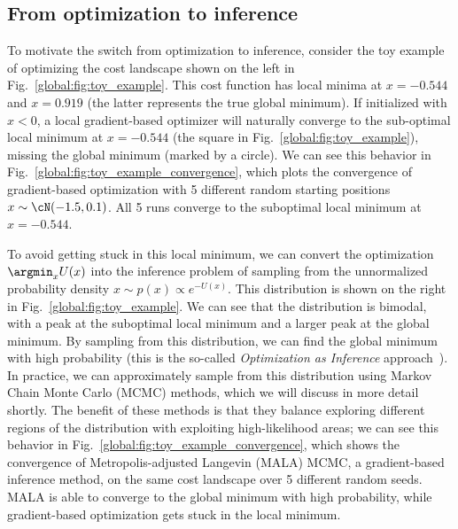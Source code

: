 


\subsection{From optimization to inference}

To motivate the switch from optimization to inference, consider the toy example of optimizing the cost landscape shown on the left in Fig.~\ref{global:fig:toy_example}. This cost function has local minima at $x = -0.544$ and $x = 0.919$ (the latter represents the true global minimum). If initialized with $x < 0$, a local gradient-based optimizer will naturally converge to the sub-optimal local minimum at $x = -0.544$ (the square in Fig.~\ref{global:fig:toy_example}), missing the global minimum (marked by a circle). We can see this behavior in Fig.~\ref{global:fig:toy_example_convergence}, which plots the convergence of gradient-based optimization with 5 different random starting positions $x\sim\cN(-1.5, 0.1)$. All 5 runs converge to the suboptimal local minimum at $x = -0.544$.

To avoid getting stuck in this local minimum, we can convert the optimization $\argmin_x U(x)$ into the inference problem of sampling from the unnormalized probability density $x \sim p(x) \propto e^{-U(x)}$. This distribution is shown on the right in Fig.~\ref{global:fig:toy_example}. We can see that the distribution is bimodal, with a peak at the suboptimal local minimum and a larger peak at the global minimum. By sampling from this distribution, we can find the global minimum with high probability (this is the so-called \textit{Optimization as Inference} approach~\cite{maSamplingCanBe2019,levineReinforcementLearningControl2018a}). In practice, we can approximately sample from this distribution using Markov Chain Monte Carlo (MCMC) methods, which we will discuss in more detail shortly. The benefit of these methods is that they balance exploring different regions of the distribution with exploiting high-likelihood areas; we can see this behavior in Fig.~\ref{global:fig:toy_example_convergence}, which shows the convergence of Metropolis-adjusted Langevin (MALA) MCMC, a gradient-based inference method, on the same cost landscape over 5 different random seeds. MALA is able to converge to the global minimum with high probability, while gradient-based optimization gets stuck in the local minimum.

